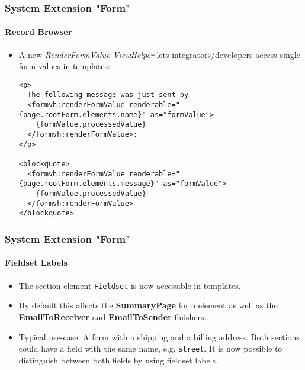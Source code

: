 
\begin{frame}[fragile]
	\frametitle{System Extension "Form"}
	\framesubtitle{Record Browser}

	\lstset{basicstyle=\tiny\ttfamily}

	\begin{itemize}
		\item A new \textit{RenderFormValue-ViewHelper} lets integrators/developers access single form values in templates:
\begin{lstlisting}
<p>
  The following message was just sent by
  <formvh:renderFormValue renderable="{page.rootForm.elements.name}" as="formValue">
    {formValue.processedValue}
  </formvh:renderFormValue>:
</p>

<blockquote>
  <formvh:renderFormValue renderable="{page.rootForm.elements.message}" as="formValue">
    {formValue.processedValue}
  </formvh:renderFormValue>
</blockquote>
\end{lstlisting}

	\end{itemize}

\end{frame}


\begin{frame}[fragile]
	\frametitle{System Extension "Form"}
	\framesubtitle{Fieldset Labels}

	\begin{itemize}
		\item The section element \texttt{Fieldset} is now accessible in templates.
		\item By default this affects the \textbf{SummaryPage} form element as well as the \textbf{EmailToReceiver} and \textbf{EmailToSender} finishers.
		\item Typical use-case:\newline
			\small
				A form with a shipping and a billing address. Both sections could have a field with the same name, e.g. \texttt{street}.
				It is now possible to distinguish between both fields by using fieldset labels.
			\normalsize

	\end{itemize}

\end{frame}

